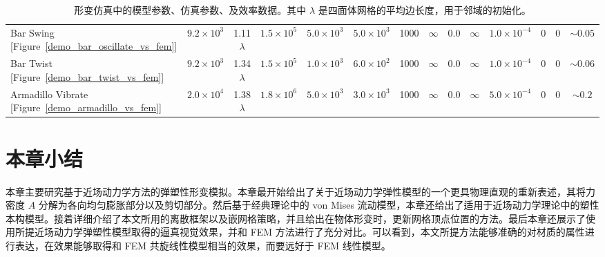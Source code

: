 \begin{table}[htb]
{{\begin{tabular}{lccccccccccccc}
  Bar Swing [Figure~\ref{demo_bar_oscillate_vs_fem}]     & $9.2\times10^3$ & 1.11 $\lambda$ & $1.5\times10^5$ & $5.0\times10^3$   & $5.0\times10^3$          & 1000 & $\infty $ & 0.0             & $\infty$ & $1.0\times10^{-4}$ &0&0& $\sim0.05$ \\
  Bar Twist [Figure~\ref{demo_bar_twist_vs_fem}]     & $9.2\times10^3$ & 1.34 $\lambda$ & $1.5\times10^5$ & $1.0\times10^3$   & $6.0\times10^2$          & 1000 & $\infty $ & 0.0             & $\infty$ & $1.0\times10^{-4}$ &0&0& $\sim0.06$ \\
  Armadillo Vibrate [Figure~\ref{demo_armadillo_vs_fem}]     & $2.0\times10^4$ & 1.38 $\lambda$ & $1.8\times10^6$ & $5.0\times10^3$   & $3.0\times10^3$          & 1000 & $\infty $ & 0.0             & $\infty$ & $5.0\times10^{-4}$ &0&0& $\sim0.2$ \\
  \hline
\end{tabular}
}
}
\caption{形变仿真中的模型参数、仿真参数、及效率数据。其中 $\lambda$ 是四面体网格的平均边长度，用于邻域的初始化。}
\label{deformation_results_table}
\end{table}

\section{本章小结}
本章主要研究基于近场动力学方法的弹塑性形变模拟。本章最开始给出了关于近场动力学弹性模型的一个更具物理直观的重新表述，其将力密度 $A$ 分解为各向均匀膨胀部分以及剪切部分。然后基于经典理论中的 von Mises 流动模型，本章还给出了适用于近场动力学理论中的塑性本构模型。接着详细介绍了本文所用的离散框架以及嵌网格策略，并且给出在物体形变时，更新网格顶点位置的方法。最后本章还展示了使用所提近场动力学弹塑性模型取得的逼真视觉效果，并和 FEM 方法进行了充分对比。可以看到，本文所提方法能够准确的对材质的属性进行表达，在效果能够取得和 FEM 共旋线性模型相当的效果，而要远好于 FEM 线性模型。
